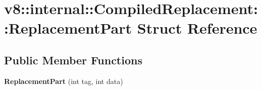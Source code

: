 \hypertarget{structv8_1_1internal_1_1_compiled_replacement_1_1_replacement_part}{}\section{v8\+:\+:internal\+:\+:Compiled\+Replacement\+:\+:Replacement\+Part Struct Reference}
\label{structv8_1_1internal_1_1_compiled_replacement_1_1_replacement_part}
\subsection*{Public Member Functions}
\begin{DoxyCompactItemize}
\item 
{\bfseries Replacement\+Part} (int tag, int data)\hypertarget{structv8_1_1internal_1_1_compiled_replacement_1_1_replacement_part_a0f33cfe19ecb3c36f705a99e96f7e331}{}\label{structv8_1_1internal_1_1_compiled_replacement_1_1_replacement_part_a0f33cfe19ecb3c36f705a99e96f7e331}

\end{DoxyCompactItemize}
